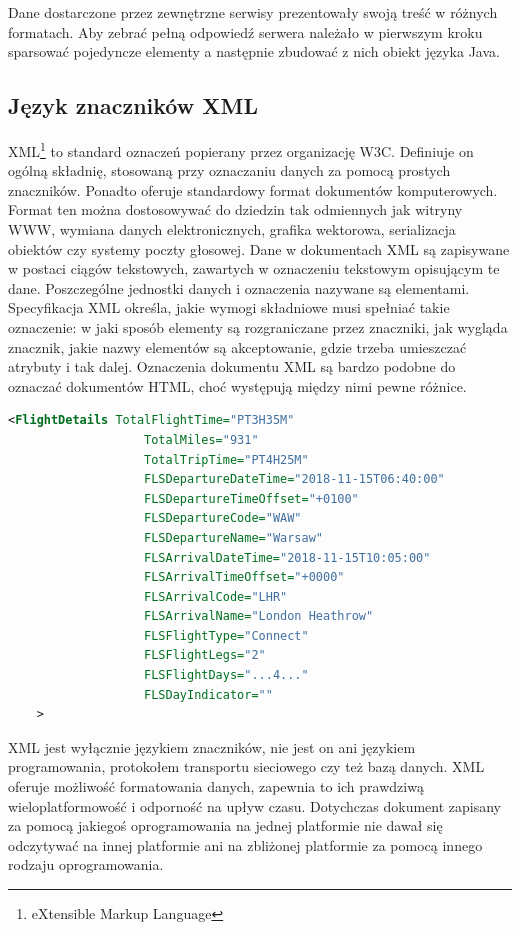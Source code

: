 \documentclass[12pt, twoside]{report}
\begin{document}
Dane dostarczone przez zewnętrzne serwisy prezentowały swoją treść w różnych formatach. Aby zebrać pełną odpowiedź serwera należało w pierwszym kroku sparsować pojedyncze elementy a następnie zbudować z nich obiekt języka Java.
\subsection{Język znaczników XML}
XML\footnote{eXtensible Markup Language} to standard oznaczeń popierany przez organizację W3C. Definiuje on ogólną składnię, stosowaną przy oznaczaniu danych za pomocą prostych znaczników.\cite{xml} Ponadto oferuje standardowy format dokumentów komputerowych. Format ten można dostosowywać do dziedzin tak odmiennych jak witryny WWW, wymiana danych elektronicznych, grafika wektorowa, serializacja obiektów czy systemy poczty głosowej. Dane w dokumentach XML są zapisywane w postaci ciągów tekstowych, zawartych w oznaczeniu tekstowym opisującym te dane. Poszczególne jednostki danych i oznaczenia nazywane są elementami. Specyfikacja XML określa, jakie wymogi składniowe musi spełniać takie oznaczenie: w jaki sposób elementy są rozgraniczane przez znaczniki, jak wygląda znacznik, jakie nazwy elementów są akceptowanie, gdzie trzeba umieszczać atrybuty i tak dalej. Oznaczenia dokumentu XML są bardzo podobne do oznaczać dokumentów HTML, choć występują między nimi pewne różnice.

\begin{lstlisting}[language=XML, caption=Fragment danych w formacie XML]
    <FlightDetails TotalFlightTime="PT3H35M"
                   TotalMiles="931"
                   TotalTripTime="PT4H25M"
                   FLSDepartureDateTime="2018-11-15T06:40:00"
                   FLSDepartureTimeOffset="+0100"
                   FLSDepartureCode="WAW"
                   FLSDepartureName="Warsaw"
                   FLSArrivalDateTime="2018-11-15T10:05:00"
                   FLSArrivalTimeOffset="+0000"
                   FLSArrivalCode="LHR"
                   FLSArrivalName="London Heathrow"
                   FLSFlightType="Connect"
                   FLSFlightLegs="2"
                   FLSFlightDays="...4..."
                   FLSDayIndicator=""
    >
\end{lstlisting}
\newpage
XML jest wyłącznie językiem znaczników, nie jest on ani językiem programowania, protokołem transportu sieciowego czy też bazą danych. XML oferuje możliwość formatowania danych, zapewnia to ich prawdziwą wieloplatformowość i odporność na upływ czasu. Dotychczas dokument zapisany za pomocą jakiegoś oprogramowania na jednej platformie nie dawał się odczytywać na innej platformie ani na zbliżonej platformie za pomocą innego rodzaju oprogramowania. 
\end{document}
